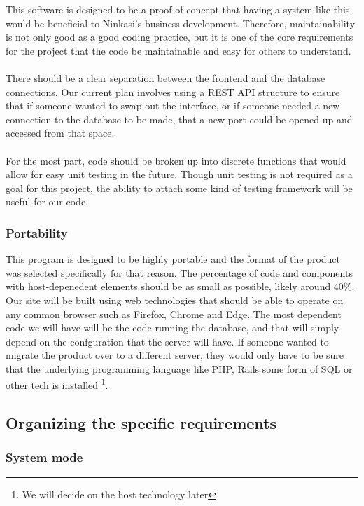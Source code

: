\documentclass[draftclsnofoot,onecolumn,letterpaper,10pt,compsoc]{IEEEtran}
\begin{document}
		This software is designed to be a proof of concept that having a system like this would be beneficial to Ninkasi's business development.
		Therefore, maintainability is not only good as a good coding practice, but it is one of the core requirements for the project that the code be maintainable and easy for others to understand.
		\\ \\
		There should be a clear separation between the frontend and the database connections.
		Our current plan involves using a REST API structure to ensure that if someone wanted to swap out the interface, or if someone needed a new connection to the database to be made, that a new port could be opened up and accessed from that space.
		\\ \\
		For the most part, code should be broken up into discrete functions that would allow for easy unit testing in the future.
		Though unit testing is not required as a goal for this project, the ability to attach some kind of testing framework will be useful for our code.

		\subsubsection{Portability}

		This program is designed to be highly portable and the format of the product was selected specifically for that reason.
		The percentage of code and components with host-depenedent elements should be as small as possible, likely around 40\%.
		Our site will be built using web technologies that should be able to operate on any common browser such as Firefox, Chrome and Edge.
		The most dependent code we will have will be the code running the database, and that will simply depend on the confguration that the server will have.
		If someone wanted to migrate the product over to a different server, they would only have to be sure that the underlying programming language like PHP, Rails some form of SQL or other tech is installed
		\footnote{We will decide on the host technology later}.

	\subsection{Organizing the specific requirements}
		\subsubsection{System mode}
\end{document}
